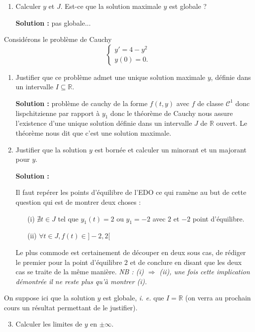 \documentclass[12pt,a4paper]{article}
\newcommand{\R}{\mathbb{R}}
\newcommand{\solution}[1]{\par\noindent\textbf{\color{OliveGreen}Solution :} \textcolor{OliveGreen}{#1}}
\begin{document}
\begin{exo}
\begin{enumerate}
    \item Calculer $y$ et $J$. Est-ce que la solution maximale $y$ est globale ? 
    \solution{pas globale...}
\end{enumerate}
\end{exo}


\begin{exo}
Considérons le problème de Cauchy 
$$
\begin{cases}
y'=4-y^2\\
y(0)=0.
\end{cases}
$$

\begin{enumerate}
    \item Justifier que ce problème admet une unique solution maximale $y$, définie dans un intervalle $I\subseteq\R.$
\solution{problème de cauchy de la forme $f(t,y)$ avec $f$ de classe $\mathcal{C}^1$ donc lispchitzienne par rapport à $y_1$ donc le théorème de Cauchy nous assure l'existence d'une unique solution définie dans un intervalle $J$ de $\R$ ouvert. Le théorème nous dit que c'est une solution maximale.}
    \item Justifier que la solution $y$ est bornée et calculer un minorant et un majorant pour $y.$
\solution{Il faut repérer les points d'équilibre de l'EDO ce qui ramène au but de cette question qui est de montrer deux choses :
\begin{itemize}
    \item[(i)] $\nexists t \in J$ tel que $y_1(t) = 2$ ou $ y_1 = -2$ avec $2$ et $-2$ point d'équilibre.
    \item[(ii)] $\forall t \in J, f(t) \in ]-2,2[$
\end{itemize}
Le plus commode est certainement de découper en deux sous cas, de rédiger le premier pour la point d'équilibre $2$ et de conclure en disant que les deux cas se traite de la même manière. \textit{NB : (i) $\Rightarrow$ (ii), une fois cette implication démontrée il ne reste plus qu'à montrer (i).}
}
\end{enumerate}
On suppose ici que la solution $y$ est globale, {\it i. e.} que $I=\R$ (on verra au prochain cours un résultat permettant de le justifier).
\begin{enumerate}
\setcounter{enumi}{2}
\item Calculer les limites de $y$ en $\pm\infty.$

\end{enumerate}
\end{exo}
\end{document}
